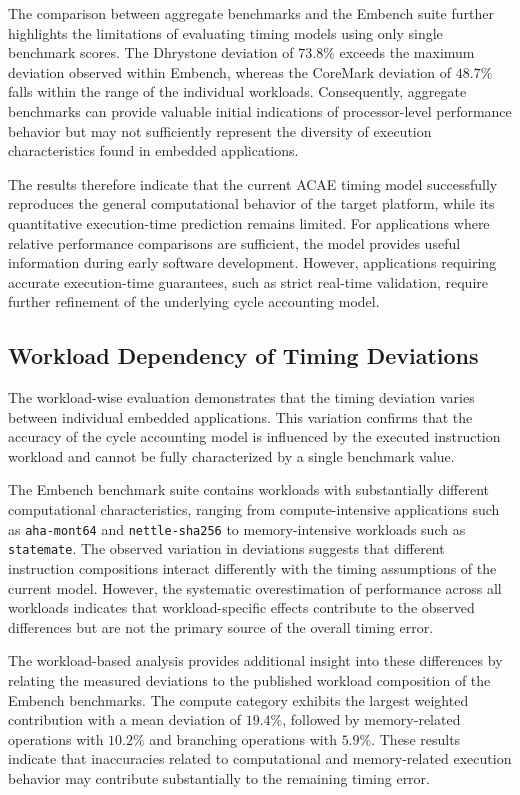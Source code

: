 \documentclass[conference]{IEEEtran}
\begin{document}
			The comparison between aggregate benchmarks and the Embench suite further highlights the limitations of evaluating timing models using only single benchmark scores.
			The Dhrystone deviation of $73.8\%$ exceeds the maximum deviation observed within Embench, whereas the CoreMark deviation of $48.7\%$ falls within the range of the individual workloads.
			Consequently, aggregate benchmarks can provide valuable initial indications of processor-level performance behavior but may not sufficiently represent the diversity of execution characteristics found in embedded applications.

			The results therefore indicate that the current \ac{ACAE} timing model successfully reproduces the general computational behavior of the target platform, while its quantitative execution-time prediction remains limited.
			For applications where relative performance comparisons are sufficient, the model provides useful information during early software development.
			However, applications requiring accurate execution-time guarantees, such as strict real-time validation, require further refinement of the underlying cycle accounting model.

		\subsection{Workload Dependency of Timing Deviations}

			The workload-wise evaluation demonstrates that the timing deviation varies between individual embedded applications.
			This variation confirms that the accuracy of the cycle accounting model is influenced by the executed instruction workload and cannot be fully characterized by a single benchmark value.

			The Embench benchmark suite contains workloads with substantially different computational characteristics, ranging from compute-intensive applications such as \texttt{aha-mont64} and \texttt{nettle-sha256} to memory-intensive workloads such as \texttt{statemate}.
			The observed variation in deviations suggests that different instruction compositions interact differently with the timing assumptions of the current model.
			However, the systematic overestimation of performance across all workloads indicates that workload-specific effects contribute to the observed differences but are not the primary source of the overall timing error.

			The workload-based analysis provides additional insight into these differences by relating the measured deviations to the published workload composition of the Embench benchmarks.
			The compute category exhibits the largest weighted contribution with a mean deviation of $19.4\%$, followed by memory-related operations with $10.2\%$ and branching operations with $5.9\%$.
			These results indicate that inaccuracies related to computational and memory-related execution behavior may contribute substantially to the remaining timing error.
\end{document}

